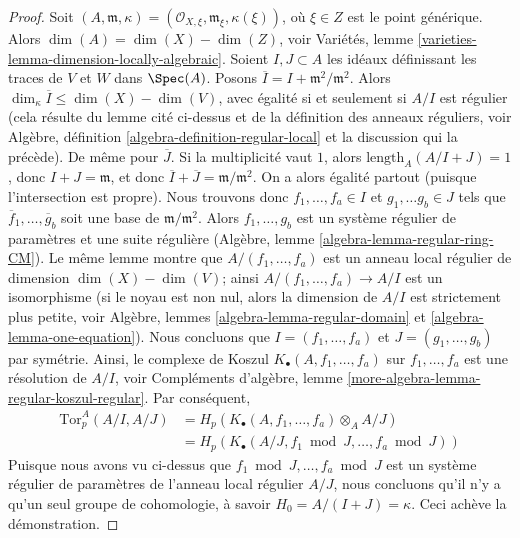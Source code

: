 \begin{proof}
Soit $(A, \mathfrak m, \kappa) =
(\mathcal{O}_{X, \xi}, \mathfrak m_\xi, \kappa(\xi))$, où $\xi \in Z$
est le point générique. Alors $\dim(A) = \dim(X) - \dim(Z)$, voir
Variétés, lemme \ref{varieties-lemma-dimension-locally-algebraic}.
Soient $I, J \subset A$ les idéaux définissant les traces de $V$ et $W$
dans $\Spec(A)$. Posons $\overline{I} = I + \mathfrak m^2/\mathfrak m^2$.
Alors $\dim_\kappa \overline{I} \leq \dim(X) - \dim(V)$, avec égalité
si et seulement si $A/I$ est régulier (cela résulte du lemme cité
ci-dessus et de la définition des anneaux réguliers, voir
Algèbre, définition \ref{algebra-definition-regular-local}
et la discussion qui la précède). De même pour $\overline{J}$.
Si la multiplicité vaut $1$, alors
$\text{length}_A(A/I + J) = 1$, donc $I + J = \mathfrak m$, et donc
$\overline{I} + \overline{J} = \mathfrak m/\mathfrak m^2$.
On a alors égalité partout (puisque l'intersection est
propre). Nous trouvons donc $f_1, \ldots, f_a \in I$ et $g_1, \ldots g_b \in J$
tels que $\overline{f}_1, \ldots, \overline{g}_b$ soit une base
de $\mathfrak m/\mathfrak m^2$. Alors $f_1, \ldots, g_b$ est un
système régulier de paramètres et une suite régulière
(Algèbre, lemme \ref{algebra-lemma-regular-ring-CM}).
Le même lemme montre que $A/(f_1, \ldots, f_a)$ est un anneau local régulier
de dimension $\dim(X) - \dim(V)$; ainsi $A/(f_1, \ldots, f_a) \to A/I$
est un isomorphisme (si le noyau est non nul, alors la dimension
de $A/I$ est strictement plus petite, voir
Algèbre, lemmes \ref{algebra-lemma-regular-domain} et
\ref{algebra-lemma-one-equation}).
Nous concluons que $I = (f_1, \ldots, f_a)$ et $J = (g_1, \ldots, g_b)$
par symétrie. Ainsi, le complexe de Koszul $K_\bullet(A, f_1, \ldots, f_a)$
sur $f_1, \ldots, f_a$ est une résolution de $A/I$, voir
Compléments d'algèbre, lemme \ref{more-algebra-lemma-regular-koszul-regular}.
Par conséquent,
\begin{align*}
\text{Tor}_p^A(A/I, A/J)
& =
H_p(K_\bullet(A, f_1, \ldots, f_a) \otimes_A A/J) \\
& =
H_p(K_\bullet(A/J, f_1 \bmod J, \ldots, f_a \bmod J))
\end{align*}
Puisque nous avons vu ci-dessus que $f_1 \bmod J, \ldots, f_a \bmod J$ est
un système régulier de paramètres de l'anneau local régulier $A/J$,
nous concluons qu'il n'y a qu'un seul groupe de cohomologie, à savoir
$H_0 = A/(I + J) = \kappa$. Ceci achève la démonstration.
\end{proof}

